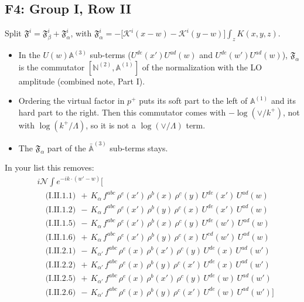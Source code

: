 \documentclass[10pt]{article}
\numberwithin{equation}{section}
\newcommand{\KK}{\mathcal K}
\newcommand{\NN}{\mathcal N}
\begin{document}
\subsection{F4: Group I, Row II}
Split $\mathfrak F^i=\mathfrak F^i_\beta+\mathfrak F^i_\alpha$, with $\mathfrak F^i_\alpha=-\big[\KK^i(x-w)-\KK^i(y-w)\big]\int_zK(x,y,z)$.
\begin{itemize}
\item In the $U(w)\mathbb A^{(3)}$ sub-terms ($U^{de}(x')U^{ad}(w)$ and $U^{de}(w')U^{ad}(w)$), $\mathfrak F_\alpha$ is the commutator $[\mathbb N^{(2)},\mathbb A^{(1)}]$ of the normalization with the LO amplitude (combined note, Part I).
\item Ordering the virtual factor in $p^+$ puts its soft part to the left of $\mathbb A^{(1)}$ and its hard part to the right. Then this commutator comes with $-\log(\vee/k^+)$, not with $\log(k^+/\Lambda)$, so it is not a $\log(\vee/\Lambda)$ term.
\item The $\mathfrak F_\alpha$ part of the $\bar{\mathbb A}^{(3)}$ sub-terms stays.
\end{itemize}
In your list this removes:
\begin{align*}
&i\NN\int e^{-ik\cdot(w'-w)}\Big[\\
&\quad\text{(I.II.1.1)}\ \ +\,K_{\alpha}\,f^{abc}\,\rho^{e}(x')\,\rho^{b}(x)\,\rho^{c}(y)\,U^{de}(x')\,U^{ad}(w)\\
&\quad\text{(I.II.1.2)}\ \ -\,K_{\alpha}\,f^{abc}\,\rho^{e}(x')\,\rho^{b}(y)\,\rho^{c}(x)\,U^{de}(x')\,U^{ad}(w)\\
&\quad\text{(I.II.1.5)}\ \ -\,K_{\alpha}\,f^{abc}\,\rho^{e}(x')\,\rho^{b}(x)\,\rho^{c}(y)\,U^{de}(w')\,U^{ad}(w)\\
&\quad\text{(I.II.1.6)}\ \ +\,K_{\alpha}\,f^{abc}\,\rho^{e}(x')\,\rho^{b}(y)\,\rho^{c}(x)\,U^{ed}(w')\,U^{ad}(w)\\
&\quad\text{(I.II.2.1)}\ \ -\,K_{\alpha'}\,f^{abc}\,\rho^{e}(x)\,\rho^{b}(x')\,\rho^{c}(y)\,U^{de}(x)\,U^{ad}(w')\\
&\quad\text{(I.II.2.2)}\ \ +\,K_{\alpha'}\,f^{abc}\,\rho^{e}(x)\,\rho^{b}(y)\,\rho^{c}(x')\,U^{de}(x)\,U^{ad}(w')\\
&\quad\text{(I.II.2.5)}\ \ +\,K_{\alpha'}\,f^{abc}\,\rho^{e}(x)\,\rho^{b}(x')\,\rho^{c}(y)\,U^{de}(w)\,U^{ad}(w')\\
&\quad\text{(I.II.2.6)}\ \ -\,K_{\alpha'}\,f^{abc}\,\rho^{e}(x)\,\rho^{b}(y)\,\rho^{c}(x')\,U^{de}(w)\,U^{ad}(w')\Big]
\end{align*}
\end{document}
